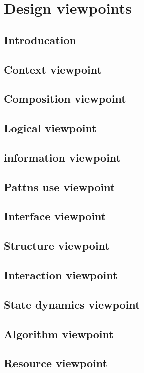 \documentclass{scrreprt}
\begin{document}
\chapter{Design viewpoints}

\section{Introducation}

\section{Context viewpoint}

\section{Composition viewpoint}

\section{Logical viewpoint}

\section{information viewpoint}

\section{Pattns use viewpoint}

\section{Interface viewpoint}

\section{Structure viewpoint}

\section{Interaction viewpoint}

\section{State dynamics viewpoint}

\section{Algorithm viewpoint}

\section{Resource viewpoint}
\end{document}
